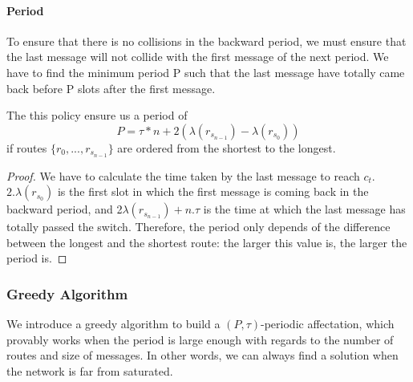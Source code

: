 \documentclass[a4paper,10pt]{article}
\begin{document}
      \paragraph{Period}
      To ensure that there is no collisions in the backward period, we must ensure that the last message will not collide with the first message of the next period. We have to find the minimum period P such that the last message have totally came back before P slots after the first message.
      
      The this policy ensure us a period of $$P = \tau * n + 2(\lambda(r_{s_{n-1}}) - \lambda(r_{s_0}))$$ if routes $\{r_0,...,r_{s_{n-1}}\}$ are ordered
from the shortest to the longest. 
 \begin{proof}
We have to calculate the time taken by the last message to reach $c_t$. $2.\lambda(r_{s_0})$ is the first slot in which the first message is coming back in the backward period,
and 2$\lambda(r_{s_{n-1}}) + n . \tau $ is the time at which the last message has totally passed the switch.
Therefore, the period only depends of the difference between the longest and the shortest route: the larger this value is, the larger
the period is.
  \end{proof}    
   
    \subsubsection{Greedy Algorithm}
    
    We introduce a greedy algorithm to build a $(P,\tau)$-periodic affectation, which provably works when
    the period is large enough with regards to the number of routes and size of messages. In other words, 
    we can always find a solution when the network is far from saturated. 
    
\end{document}
